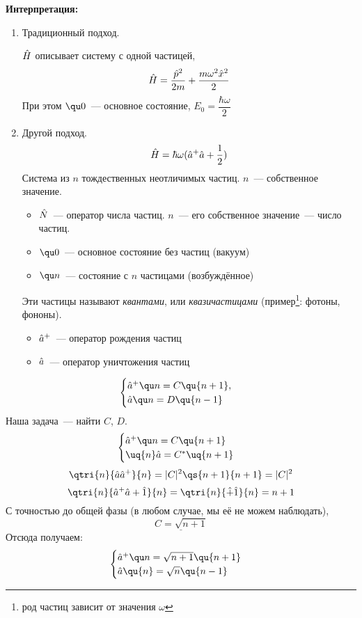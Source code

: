 \textbf{Интерпретация:}
\begin{enumerate}
  \item Традиционный подход.
  
  $\Hat H$ описывает систему с одной частицей,
  $$
    \Hat H = \dfrac{\Hat p^2}{2m} + \dfrac{m \omega^2 \Hat x^2}{2}
  $$
  При этом $\qu 0$~--- основное состояние, $E_0 = \dfrac{\hbar \omega}{2}$
  \item Другой подход.
  $$
    \Hat H = \hbar \omega (\Hat a^+ \Hat a + \dfrac12)
  $$
  Система из $n$ тождественных неотличимых частиц. $n$~--- собственное значение.
  
  \begin{itemize}
    \item $\Hat N$~--- оператор числа частиц. $n$~--- его собственное значение~--- число частиц.
    \item $\qu 0$~--- основное состояние без частиц (вакуум)
    \item $\qu n$~--- состояние с $n$ частицами (возбуждённое)
  \end{itemize}
  Эти частицы называют \emph{квантами}, или \emph{квазичастицами} (пример\footnote{род частиц зависит от значения $\omega$}: фотоны, фононы).
  \begin{itemize}
    \item $\Hat a^+$~--- оператор рождения частиц
    \item $\Hat a$~--- оператор уничтожения частиц
  \end{itemize}
\end{enumerate}
$$
    \begin{cases}
        \Hat a^+ \qu n = C \qu{n+1},\\
        \Hat a \qu n = D \qu{n-1}
    \end{cases}
$$
Наша задача~--- найти $C$, $D$.
$$
    \begin{cases}
        \Hat a^+ \qu n = C \qu{n+1}\\
        \uq{n} \Hat a = C^\ast \uq{n+1}
    \end{cases}
$$
$$
    \qtri{n}{\Hat a \Hat a^+}{n} = |C|^2 \qs{n+1}{n+1} = |C|^2
$$
$$
    \qtri{n}{\hat a^+ \hat a + \hat 1}{n} = \qtri{n}{\Hat + \hat 1}{n} = n+1
$$
С точностью до общей фазы (в любом случае, мы её не можем наблюдать),
$$
\underline{    C = \sqrt{n+1}}
$$
Отсюда получаем:
$$
    \begin{cases}
        \hat a^+ \qu n = \sqrt{n+1} \qu{n+1}\\
        \hat a \qu{n} = \sqrt{n} \qu{n-1}
    \end{cases}
$$

